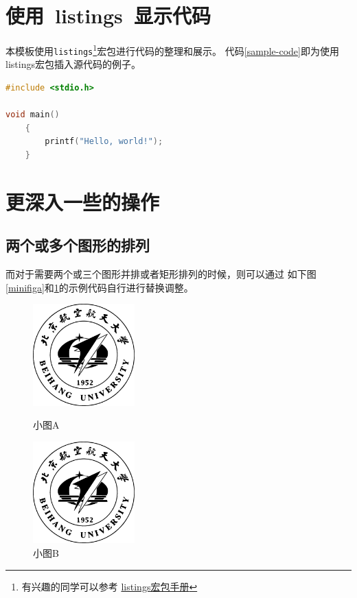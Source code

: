 \section{使用~listings~显示代码}
\label{sec-listings}
本模板使用\texttt{listings}\footnote{有兴趣的同学可以参考
\href{http://mirror.ctan.org/macros/latex/contrib/listings/listings.pdf}
{listings宏包手册}}宏包进行代码的整理和展示。
代码\ref{sample-code}即为使用listings宏包插入源代码的例子。

\begin{lstlisting}[language={C}, caption={一段C源代码},label={sample-code}]
#include <stdio.h>

void main() 
	{
		printf("Hello, world!");
	}
\end{lstlisting}

\section{更深入一些的操作}
\label{sec-more}

\subsection{两个或多个图形的排列}
\label{subsec-morefig}
而对于需要两个或三个图形并排或者矩形排列的时候，则可以通过
如下图\ref{minifiga}和\ref{minifigb}的示例代码自行进行替换调整。

\begin{figure}
\begin{minipage}{0.5\textwidth}
    \centering
    \includegraphics[width=0.35\textwidth]{figure/buaamark.eps}
    \caption{小图A}
    \label{minifiga}
\end{minipage}
\begin{minipage}{0.5\textwidth}
    \centering
    \includegraphics[width=0.35\textwidth]{figure/buaamark.eps}
    \caption{小图B}
    \label{minifigb}
\end{minipage}
\end{figure}

